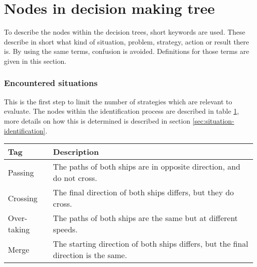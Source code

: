 \section{Nodes in decision making tree}
To describe the nodes within the decision trees, short keywords are used. These describe in short what kind of situation, problem, strategy, action or result there is. By using the same terms, confusion is avoided. Definitions for those terms are given in this section.

\subsubsection{Encountered situations}
This is the first step to limit the number of strategies which are relevant to evaluate. The nodes within the identification process are described in table \ref{tab:situations}, more details on how this is determined is described in section \ref{sec:situation-identification}.
\begin{table}[H]
	\begin{tabular}{p{}|p{}}
		\toprule
		Tag & Description\\
		\midrule
		Passing & The paths of both ships are in opposite direction, and do not cross. \\
		Crossing & The final direction of both ships differs, but they do cross. \\
		Over-taking & The paths of both ships are the same but at different speeds. \\
		Merge & The starting direction of both ships differs, but the final direction is the same. \\
		\bottomrule
	\end{tabular}
	
	\label{tab:situations}
\end{table}

